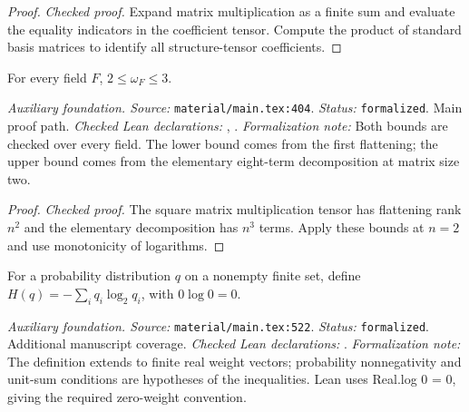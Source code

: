 \begin{proof}
\leanok
{}
\textit{Checked proof.} Expand matrix multiplication as a finite sum and evaluate the equality indicators in the coefficient tensor. Compute the product of standard basis matrices to identify all structure-tensor coefficients.
\end{proof}

\renewcommand{\thetheorem}{A7}
\begin{lemma}
\label{aux:omega-bounds}
\leanok
{}
For every field $F$, $2\le\omega_F\le3$.
\end{lemma}

\noindent\textit{Auxiliary foundation. Source:} \texttt{material/main.tex:404}.
\textit{Status:} \texttt{formalized}. Main proof path.
\textit{Checked Lean declarations:} , .
\textit{Formalization note:} Both bounds are checked over every field. The lower bound comes from the first flattening; the upper bound comes from the elementary eight-term decomposition at matrix size two.

\begin{proof}
\leanok
{}
\textit{Checked proof.} The square matrix multiplication tensor has flattening rank $n^2$ and the elementary decomposition has $n^3$ terms. Apply these bounds at $n=2$ and use monotonicity of logarithms.
\end{proof}

\renewcommand{\thetheorem}{A8}
\begin{definition}
\label{aux:entropy}
\leanok
For a probability distribution $q$ on a nonempty finite set, define $H(q)=-\sum_iq_i\log_2q_i$, with $0\log0=0$.
\end{definition}

\noindent\textit{Auxiliary foundation. Source:} \texttt{material/main.tex:522}.
\textit{Status:} \texttt{formalized}. Additional manuscript coverage.
\textit{Checked Lean declarations:} .
\textit{Formalization note:} The definition extends to finite real weight vectors; probability nonnegativity and unit-sum conditions are hypotheses of the inequalities. Lean uses Real.log 0 = 0, giving the required zero-weight convention.

